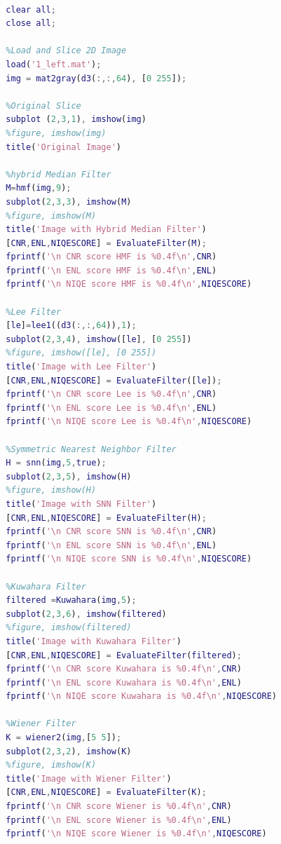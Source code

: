 \documentclass{article}
\begin{document}
\noindent\begin{minipage}{.9\textwidth}
\begin{lstlisting}[language=Matlab, caption=Script to Generate Figure of Filtered Images and Print Quality Metrics, label=code:Allcoding]
  %Script to Open and Slice an OCT Image, Apply Filtering, and Print Quality Metrics

  clear all;
  close all;

  %Load and Slice 2D Image
  load('1_left.mat');
  img = mat2gray(d3(:,:,64), [0 255]);

  %Original Slice
  subplot (2,3,1), imshow(img)
  %figure, imshow(img)
  title('Original Image')

  %hybrid Median Filter
  M=hmf(img,9);
  subplot(2,3,3), imshow(M)
  %figure, imshow(M)
  title('Image with Hybrid Median Filter')
  [CNR,ENL,NIQESCORE] = EvaluateFilter(M);
  fprintf('\n CNR score HMF is %0.4f\n',CNR)
  fprintf('\n ENL score HMF is %0.4f\n',ENL)
  fprintf('\n NIQE score HMF is %0.4f\n',NIQESCORE)

  %Lee Filter
  [le]=lee1((d3(:,:,64)),1);
  subplot(2,3,4), imshow([le], [0 255])
  %figure, imshow([le], [0 255])
  title('Image with Lee Filter')
  [CNR,ENL,NIQESCORE] = EvaluateFilter([le]);
  fprintf('\n CNR score Lee is %0.4f\n',CNR)
  fprintf('\n ENL score Lee is %0.4f\n',ENL)
  fprintf('\n NIQE score Lee is %0.4f\n',NIQESCORE)

  %Symmetric Nearest Neighbor Filter
  H = snn(img,5,true);
  subplot(2,3,5), imshow(H)
  %figure, imshow(H)
  title('Image with SNN Filter')
  [CNR,ENL,NIQESCORE] = EvaluateFilter(H);
  fprintf('\n CNR score SNN is %0.4f\n',CNR)
  fprintf('\n ENL score SNN is %0.4f\n',ENL)
  fprintf('\n NIQE score SNN is %0.4f\n',NIQESCORE)

  %Kuwahara Filter
  filtered =Kuwahara(img,5);
  subplot(2,3,6), imshow(filtered)
  %figure, imshow(filtered)
  title('Image with Kuwahara Filter')
  [CNR,ENL,NIQESCORE] = EvaluateFilter(filtered);
  fprintf('\n CNR score Kuwahara is %0.4f\n',CNR)
  fprintf('\n ENL score Kuwahara is %0.4f\n',ENL)
  fprintf('\n NIQE score Kuwahara is %0.4f\n',NIQESCORE)

  %Wiener Filter
  K = wiener2(img,[5 5]);
  subplot(2,3,2), imshow(K)
  %figure, imshow(K)
  title('Image with Wiener Filter')
  [CNR,ENL,NIQESCORE] = EvaluateFilter(K);
  fprintf('\n CNR score Wiener is %0.4f\n',CNR)
  fprintf('\n ENL score Wiener is %0.4f\n',ENL)
  fprintf('\n NIQE score Wiener is %0.4f\n',NIQESCORE)
\end{lstlisting}
\end{minipage}

  \clearpage
	
	\show\tableofcontents
	\show\lstlistoflistings
	\show\listoftables
	\show\listoffigures
\end{document}
